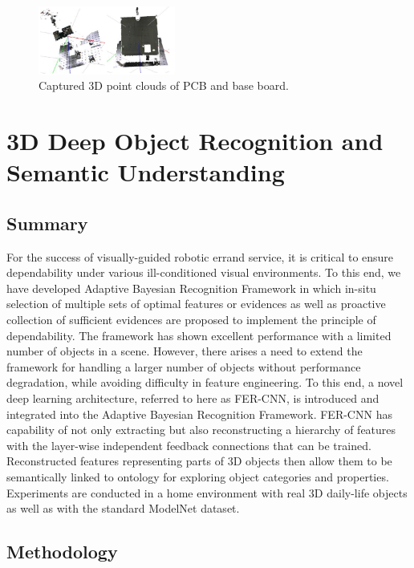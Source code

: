 \documentclass{ieeeaccess}
\begin{document}
\begin{figure}[t!]
\centering
\includegraphics[width=0.4\textwidth]{bayesian_result.png}
\caption{Captured 3D point clouds of PCB and base board.}
\end{figure}

\section{3D Deep Object Recognition and Semantic Understanding}
\subsection{Summary}
For the success of visually-guided robotic errand
service, it is critical to ensure dependability under various
ill-conditioned visual environments. To this end, we have
developed Adaptive Bayesian Recognition Framework in which
in-situ selection of multiple sets of optimal features or evidences
as well as proactive collection of sufficient evidences are
proposed to implement the principle of dependability. The
framework\cite{8593985} has shown excellent performance with a limited
number of objects in a scene. However, there arises a need to
extend the framework for handling a larger number of objects
without performance degradation, while avoiding difficulty in
feature engineering. To this end, a novel deep learning
architecture, referred to here as FER-CNN, is introduced and
integrated into the Adaptive Bayesian Recognition Framework.
FER-CNN has capability of not only extracting but also
reconstructing a hierarchy of features with the layer-wise
independent feedback connections that can be trained.
Reconstructed features representing parts of 3D objects then
allow them to be semantically linked to ontology for exploring
object categories and properties. Experiments are conducted in a
home environment with real 3D daily-life objects as well as with
the standard ModelNet dataset.
\subsection{Methodology}
\end{document}
